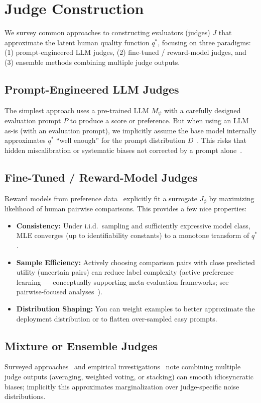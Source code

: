 \section{Judge Construction} 
We survey common approaches to constructing evaluators (judges) $J$ that approximate the latent human quality function $q^{*}$, focusing on three paradigms: (1) prompt-engineered LLM judges, (2) fine-tuned / reward-model judges, and (3) ensemble methods combining multiple judge outputs.

\subsection{Prompt-Engineered LLM Judges}
The simplest approach uses a pre-trained LLM $M_{\psi}$ with a carefully designed evaluation prompt $P$ to produce a score or preference. But when using an LLM as-is (with an evaluation prompt), we implicitly assume the base model internally approximates $q^{*}$ “well enough” for the prompt distribution $D$~\cite{li2024_llmsasjudges, fu2023gptscore}. This risks that hidden miscalibration or systematic biases not corrected by a prompt alone~\cite{bavaresco2024judgebench, hada2024metal}.

\subsection{Fine-Tuned / Reward-Model Judges}
Reward models from preference data~\cite{stiennon2020learning, ouyang2022training} explicitly fit a surrogate $J_{\phi}$ by maximizing likelihood of human pairwise comparisons. This provides a few nice properties:
\begin{itemize}
	\item \textbf{Consistency:} Under i.i.d.\ sampling and sufficiently expressive model class, MLE converges (up to identifiability constants) to a monotone transform of $q^{*}$.
	\item \textbf{Sample Efficiency:} Actively choosing comparison pairs with close predicted utility (uncertain pairs) can reduce label complexity (active preference learning — conceptually supporting meta-evaluation frameworks; see pairwise-focused analyses~\cite{liu2024pairs}).
	\item \textbf{Distribution Shaping:} You can weight examples to better approximate the deployment distribution or to flatten over-sampled easy prompts.
\end{itemize}

\subsection{Mixture or Ensemble Judges}
Surveyed approaches~\cite{li2024_llmsasjudges} and empirical investigations~\cite{bavaresco2024judgebench} note combining multiple judge outputs (averaging, weighted voting, or stacking) can smooth idiosyncratic biases; implicitly this approximates marginalization over judge-specific noise distributions.